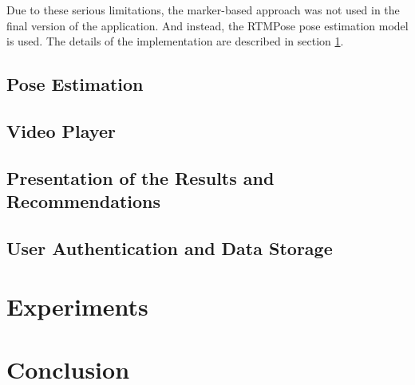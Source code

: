 Due to these serious limitations, the marker-based approach was not used in the final version of the application. And instead, the RTMPose pose estimation model is used. The details of the implementation are described in section \ref{pose_estimation}.



\section{Pose Estimation}
\label{pose_estimation}

\section{Video Player}
\label{video_player}

\section{Presentation of the Results and Recommendations}

\section{User Authentication and Data Storage}




\chapter{Experiments}
\label{experiments}


\chapter{Conclusion}
\label{conclusion}




% 